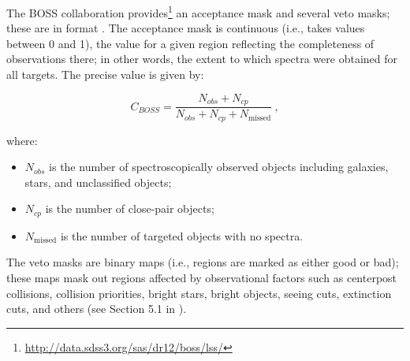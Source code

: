 The BOSS collaboration provides\footnote{\url{http://data.sdss3.org/sas/dr12/boss/lss/}} an acceptance mask and several veto masks; these are in \mangle format \citep{2008Mangle}. The acceptance mask is continuous (i.e., takes values between 0 and 1), the value for a given region reflecting the completeness of observations there; in other words, the extent to which spectra were obtained for all targets. The precise value is given by:

\begin{equation}
C_{BOSS} = \frac{N_{obs}+N_{cp}}{N_{obs}+N_{cp}+N_{\text{missed}}} \ ,
\end{equation}

\noindent where:

\begin{itemize}
\item $N_{obs}$ is the number of spectroscopically observed objects including galaxies, stars, and unclassified objects; 
\item $N_{cp}$ is the number of close-pair objects;
\item $N_{\text{missed}}$ is the number of targeted objects with no spectra.
\end{itemize}

\qquad The veto masks are binary maps (i.e., regions are marked as either good or bad); these maps mask out regions affected by observational factors such as centerpost collisions, collision priorities, bright stars, bright objects, seeing cuts, extinction cuts, and others (see Section 5.1 in \cite{BOSSCatalogue2016}).

